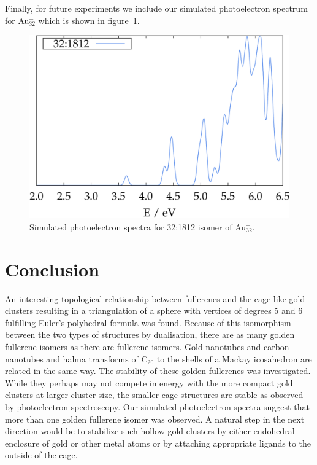 Finally, for future experiments we include our simulated photoelectron spectrum
for Au$_{32}^-$ which is shown in figure~\ref{fig:photo_Au32}. 
%
\begin{figure}[htb]
\begin{center}
\includegraphics[width=.75\textwidth]{golddual/photo/Au32/nonrel/compare.pdf}
\caption{Simulated photoelectron spectra for 32:1812 isomer of Au$_{32}^-$.}
  \label{fig:photo_Au32}
\end{center}
\end{figure}

\section{Conclusion}

An interesting topological relationship between fullerenes and the cage-like
gold clusters resulting in a triangulation of a sphere with vertices of degrees
5 and 6 fulfilling Euler's polyhedral formula was found. Because of this
isomorphism between the two types of structures by dualisation, there are as
many golden fullerene isomers as there are fullerene isomers. Gold nanotubes and
carbon nanotubes and halma transforms of C$_{20}$ to the shells of a Mackay
icosahedron are related in the same way. The stability of these golden
fullerenes was investigated. While they perhaps may not compete in energy with
the more compact gold clusters at larger cluster size, the smaller cage
structures are stable as observed by photoelectron spectroscopy. Our simulated
photoelectron spectra suggest that more than one golden fullerene isomer was
observed. A natural step in the next direction would be to stabilize such hollow
gold clusters by either endohedral enclosure of gold or other metal atoms or by
attaching appropriate ligands to the outside of the cage.




